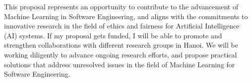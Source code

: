 \documentclass[10pt,notitlepage]{article}
\begin{document}

%




This proposal represents an opportunity to contribute to the advancement of Machine Learning in Software Engineering, and aligns with the commitments to innovative research in the field of ethics and fairness for Artificial Intelligence (AI) systems. If my proposal gets funded, I will be able to promote and strengthen collaborations with different research groups in Hanoi. %
We will be working diligently to advance ongoing research efforts, and propose practical solutions that address unresolved issues in the field of Machine Learning for Software Engineering. 
\end{document}
